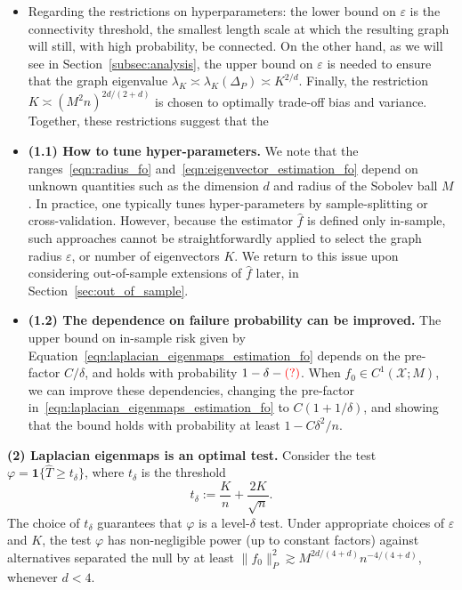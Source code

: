 \documentclass{article}
\newcommand{\1}{\mathbf{1}}
\newcommand{\mc}[1]{\mathcal{#1}}
\newcommand{\wh}[1]{\widehat{#1}}
\theoremstyle{alden}
\theoremstyle{aldenthm}
\theoremstyle{definition}
\theoremstyle{remark}
\begin{document}
\begin{itemize}
	\item Regarding the restrictions on hyperparameters: the lower bound on $\varepsilon$ is the connectivity threshold, the smallest length scale at which the resulting graph will still, with high probability, be connected. On the other hand, as we will see in Section~\ref{subsec:analysis}, the upper bound on $\varepsilon$ is needed to ensure that the graph eigenvalue $\lambda_K \asymp \lambda_K(\Delta_P) \asymp K^{2/d}$. Finally, the restriction $K \asymp (M^2n)^{2d/(2 + d)}$ is chosen  to optimally trade-off bias and variance. Together, these restrictions suggest that the 
	\item \textbf{(1.1) How to tune hyper-parameters.} We note that the ranges~\eqref{eqn:radius_fo} and~\eqref{eqn:eigenvector_estimation_fo} depend on unknown quantities such as the dimension $d$ and radius of the Sobolev ball $M$. In practice, one typically tunes hyper-parameters by sample-splitting or cross-validation. However, because the estimator $\wh{f}$ is defined only in-sample, such approaches cannot be straightforwardly applied to select the graph radius $\varepsilon$, or number of eigenvectors $K$. We return to this issue upon considering out-of-sample extensions of $\wh{f}$ later, in Section~\ref{sec:out_of_sample}.
	\item \textbf{(1.2) The dependence on failure probability can be improved.} The upper bound on in-sample risk given by Equation~\eqref{eqn:laplacian_eigenmaps_estimation_fo} depends on the pre-factor $C/\delta$, and holds with probability $1 - \delta - \textcolor{red}{(?)}$. When $f_0 \in C^1(\mc{X};M)$, we can improve these dependencies, changing the pre-factor in~\eqref{eqn:laplacian_eigenmaps_estimation_fo} to $C(1 + 1/\delta)$, and showing that the bound holds with probability at least $1 - C\delta^2/n$. 
\end{itemize}

\textbf{(2) Laplacian eigenmaps is an optimal test.} Consider the test $\varphi = \1\{\wh{T} \geq t_{\delta}\}$, where $t_{\delta}$ is the threshold
\begin{equation*}
t_{\delta} := \frac{K}{n} + \frac{2K}{\sqrt{n}}.
\end{equation*}
The choice of $t_{\delta}$ guarantees that $\varphi$ is a level-$\delta$ test. Under appropriate choices of $\varepsilon$ and $K$, the test $\varphi$ has non-negligible power (up to constant factors) against alternatives separated the null by at least $\|f_0\|_{P}^2 \gtrsim M^{2d/(4 + d)}n^{-4/(4 + d)}$, whenever $d < 4$. 
\end{document}
